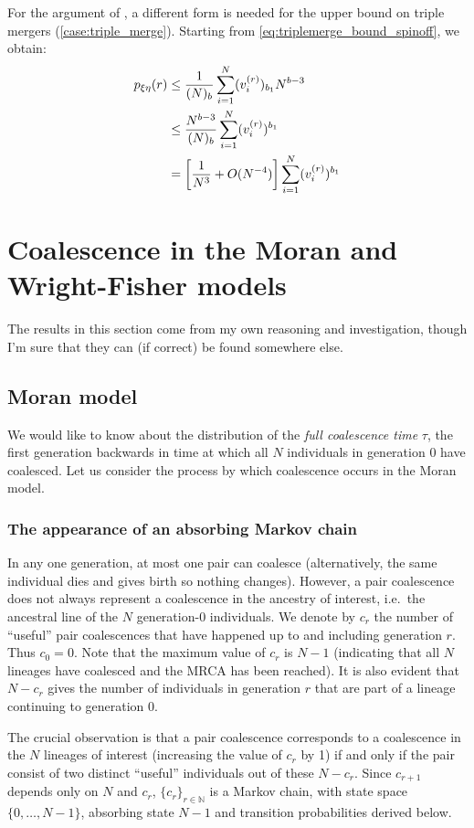 \documentclass{article}
\begin{document}
For the argument of \citet{koskela2018}, a different form is needed for the upper bound on triple mergers (\ref{case:triple_merge}). Starting from \eqref{eq:triplemerge_bound_spinoff}, we obtain:
\begin{align}
p_{\xi\eta}(r) &\leq \frac{1}{(N)_b} \sum_{i=1}^{N} (v_{i}^{(r)})_{b_1} N^{b-3} \notag\\
&\leq \frac{N^{b-3}}{(N)_b} \sum_{i=1}^{N} (v_{i}^{(r)})^{b_1} \notag\\
&= \left[ \frac{1}{N^3} + O(N^{-4}) \right] \sum_{i=1}^{N} (v_{i}^{(r)})^{b_1}
\end{align}



\section*{Coalescence in the Moran and Wright-Fisher models}
The results in this section come from my own reasoning and investigation, though I'm sure that they can (if correct) be found somewhere else.

\subsection*{Moran model}
We would like to know about the distribution of the \emph{full coalescence time} $\tau$, the first generation backwards in time at which all $N$ individuals in generation 0 have coalesced.
Let us consider the process by which coalescence occurs in the Moran model.

\subsubsection*{The appearance of an absorbing Markov chain}
In any one generation, at most one pair can coalesce (alternatively, the same individual dies and gives birth so nothing changes). However, a pair coalescence does not always represent a coalescence in the ancestry of interest, i.e.\ the ancestral line of the $N$ generation-0 individuals. 
We denote by $c_r$ the number of ``useful'' pair coalescences that have happened up to and including generation $r$. Thus $c_0=0$. Note that the maximum value of $c_r$ is $N-1$ (indicating that all $N$ lineages have coalesced and the MRCA has been reached). It is also evident that $N-c_r$ gives the number of individuals in generation $r$ that are part of a lineage continuing to generation 0. 

The crucial observation is that a pair coalescence corresponds to a coalescence in the $N$ lineages of interest (increasing the value of $c_r$ by 1) if and only if the pair consist of two distinct ``useful'' individuals out of these $N-c_r$.
Since $c_{r+1}$ depends only on $N$ and $c_r$, $\{c_r\}_{r\in\mathbb{N}}$ is a Markov chain, with state space $\{0, \dots, N-1\}$, absorbing state $N-1$ and transition probabilities derived below.
\end{document}

